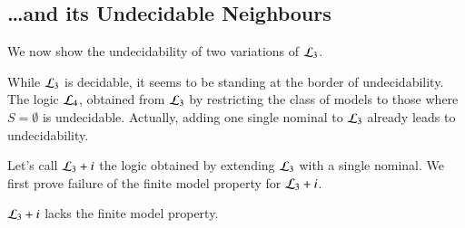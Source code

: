 
\subsection{\ldots and its Undecidable Neighbours}

We now show the undecidability of two variations of $\mathcal{L}_3$.

While $\mathcal{L}_3$ is decidable, it seems to be standing at the 
border of undecidability.  The logic $\mathcal{L}_4$, obtained from $\mathcal{L}_3$ by 
restricting the class of models to those where $S=\emptyset$ is
undecidable.  Actually, adding one single nominal to $\mathcal{L}_3$ 
already leads to undecidability.

Let's call $\mathcal{L}_3 + i$ the logic obtained by extending 
$\mathcal{L}_3$ with a single nominal. We first prove failure of
the finite model property for $\mathcal{L}_3 + i$.

\begin{thm}\label{thm:tlmi:inf}
$\mathcal{L}_3 + i$ lacks the finite model property.
\end{thm}

